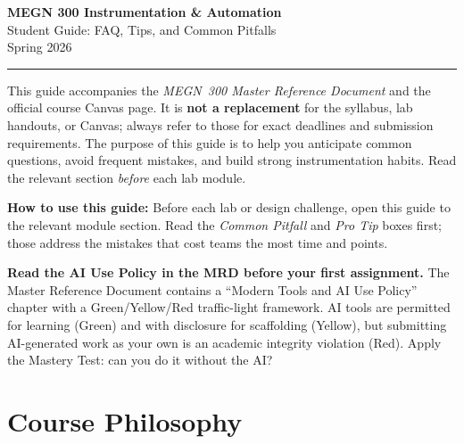 \documentclass[11pt,letterpaper]{article}
\begin{document}
\begin{center}
    {\LARGE\bfseries\textcolor{minesblue}{MEGN 300 Instrumentation \& Automation}}\\[6pt]
    {\Large\textcolor{minesblue!70}{Student Guide: FAQ, Tips, and Common Pitfalls}}\\[8pt]
    {\large Spring 2026}\\[4pt]
    \textcolor{minesgold}{\rule{0.6\textwidth}{2pt}}
\end{center}

\vspace{0.5cm}

\noindent This guide accompanies the \textit{MEGN~300 Master Reference Document} and the official course Canvas page. It is \textbf{not a replacement} for the syllabus, lab handouts, or Canvas; always refer to those for exact deadlines and submission requirements. The purpose of this guide is to help you anticipate common questions, avoid frequent mistakes, and build strong instrumentation habits. Read the relevant section \textit{before} each lab module.

\begin{tcolorbox}[colback=minesgold!10, colframe=minesgold!70!black, boxrule=0.6pt, arc=2pt, left=6pt, right=6pt, top=4pt, bottom=4pt]
\textbf{How to use this guide:} Before each lab or design challenge, open this guide to the relevant module section. Read the \textit{Common Pitfall} and \textit{Pro Tip} boxes first; those address the mistakes that cost teams the most time and points.
\end{tcolorbox}

\begin{warnbox}
\textbf{Read the AI Use Policy in the MRD before your first assignment.} The Master Reference Document contains a ``Modern Tools and AI Use Policy'' chapter with a Green/Yellow/Red traffic-light framework. AI tools are permitted for learning (Green) and with disclosure for scaffolding (Yellow), but submitting AI-generated work as your own is an academic integrity violation (Red). Apply the Mastery Test: can you do it without the AI?
\end{warnbox}

\tableofcontents
\newpage

\section{Course Philosophy}
\end{document}
